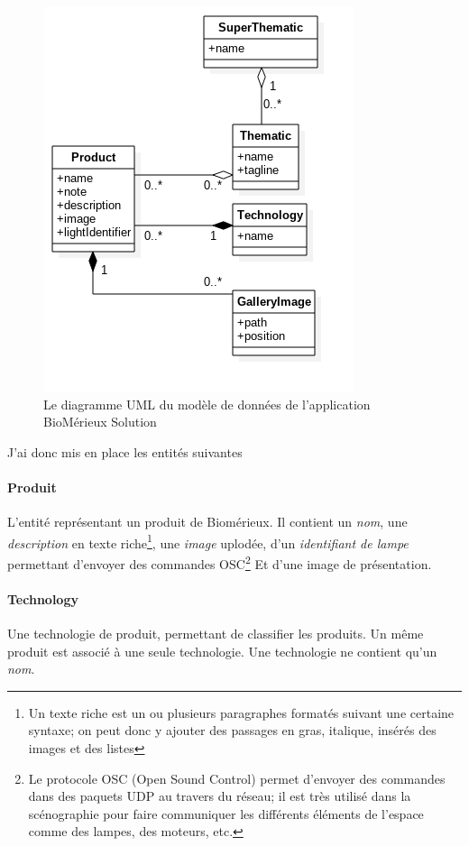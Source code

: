 \begin{figure}[h]
    \centering
    \includegraphics[scale=0.6]{img/uml-bmx-solution.png}
    \caption{Le diagramme UML du modèle de données de l'application BioMérieux Solution}
\end{figure}

\clearpage

J'ai donc mis en place les entités suivantes

\paragraph{Produit} L'entité représentant un produit de Biomérieux.
Il contient un \emph{nom}, une \emph{description} en texte riche\footnote{Un texte riche est un ou plusieurs paragraphes formatés suivant une certaine syntaxe; on peut donc y ajouter des passages en gras, italique, insérés des images et des listes}, une \emph{image} uplodée, d'un \emph{identifiant de lampe} permettant d'envoyer des commandes OSC\footnote{Le protocole OSC (Open Sound Control) permet d'envoyer des commandes dans des paquets UDP au travers du réseau; il est très utilisé dans la scénographie pour faire communiquer les différents éléments de l'espace comme des lampes, des moteurs, etc.} Et d'une image de présentation.

\paragraph{Technology} Une technologie de produit, permettant de classifier les produits.
Un même produit est associé à une seule technologie.
Une technologie ne contient qu'un \emph{nom}.

